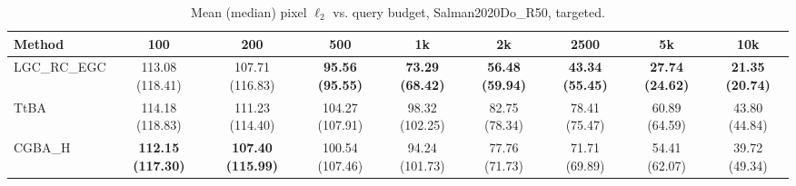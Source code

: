\begin{table}[t]
\centering\footnotesize
\caption{Mean (median) pixel $\ell_2$ vs. query budget, Salman2020Do\_R50, targeted.}
\begin{tabular}{lcccccccc}
\toprule
Method & 100 & 200 & 500 & 1k & 2k & 2500 & 5k & 10k \\
\midrule
LGC\_RC\_EGC & 113.08 (118.41) & 107.71 (116.83) & \textbf{95.56 (95.55)} & \textbf{73.29 (68.42)} & \textbf{56.48 (59.94)} & \textbf{43.34 (55.45)} & \textbf{27.74 (24.62)} & \textbf{21.35 (20.74)} \\
TtBA & 114.18 (118.83) & 111.23 (114.40) & 104.27 (107.91) & 98.32 (102.25) & 82.75 (78.34) & 78.41 (75.47) & 60.89 (64.59) & 43.80 (44.84) \\
CGBA\_H & \textbf{112.15 (117.30)} & \textbf{107.40 (115.99)} & 100.54 (107.46) & 94.24 (101.73) & 77.76 (71.73) & 71.71 (69.89) & 54.41 (62.07) & 39.72 (49.34) \\
\bottomrule
\end{tabular}
\end{table}
